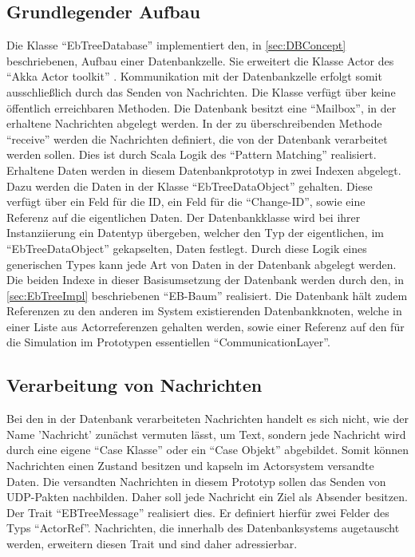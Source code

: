 \documentclass[a4paper,11pt,oneside,%
headsepline,												%
footsepline,												%
bibtotocnumbered									%
]{scrreprt}
\begin{document}
\subsection{Grundlegender Aufbau}
Die Klasse \enquote{EbTreeDatabase} implementiert den, in \autoref{sec:DBConcept} beschriebenen, Aufbau einer Datenbankzelle. Sie erweitert die Klasse Actor des \enquote{Akka Actor toolkit} \autocite{akka}. Kommunikation mit der Datenbankzelle erfolgt somit ausschließlich durch das Senden von Nachrichten. Die Klasse verfügt über keine öffentlich erreichbaren Methoden. Die Datenbank besitzt eine \enquote{Mailbox}, in der erhaltene Nachrichten abgelegt werden. In der zu überschreibenden Methode \enquote{receive} werden die Nachrichten definiert, die von der Datenbank verarbeitet werden sollen. Dies ist durch Scala Logik des \enquote{Pattern Matching} realisiert. Erhaltene Daten werden in diesem Datenbankprototyp in zwei Indexen abgelegt. Dazu werden die Daten in der Klasse \enquote{EbTreeDataObject} gehalten. Diese verfügt über ein Feld für die ID, ein Feld für die \enquote{Change-ID}, sowie eine Referenz auf die eigentlichen Daten. Der Datenbankklasse wird bei ihrer Instanziierung ein Datentyp übergeben, welcher den Typ der eigentlichen, im  \enquote{EbTreeDataObject} gekapselten, Daten festlegt. Durch diese Logik eines generischen Types kann jede Art von Daten in der Datenbank abgelegt werden. Die beiden Indexe in dieser Basisumsetzung der Datenbank werden durch den, in \autoref{sec:EbTreeImpl} beschriebenen \enquote{EB-Baum} realisiert. Die Datenbank hält zudem Referenzen zu den anderen im System existierenden Datenbankknoten, welche in einer Liste aus Actorreferenzen gehalten werden, sowie einer Referenz auf den für die Simulation im Prototypen essentiellen \enquote{CommunicationLayer}.\\
\subsection{Verarbeitung von Nachrichten}
Bei den in der Datenbank verarbeiteten Nachrichten handelt es sich nicht, wie der Name 'Nachricht' zunächst vermuten lässt, um Text, sondern jede Nachricht wird durch eine eigene \enquote{Case Klasse} oder ein \enquote{Case Objekt} abgebildet. Somit können Nachrichten einen Zustand besitzen und kapseln im Actorsystem versandte Daten. Die versandten Nachrichten in diesem Prototyp sollen das Senden von UDP-Pakten nachbilden. Daher soll jede Nachricht ein Ziel als Absender besitzen. Der Trait \enquote{EBTreeMessage} realisiert dies. Er definiert hierfür zwei Felder des Typs \enquote{ActorRef}. Nachrichten, die innerhalb des Datenbanksystems augetauscht werden, erweitern diesen Trait und sind daher adressierbar.
\end{document}
